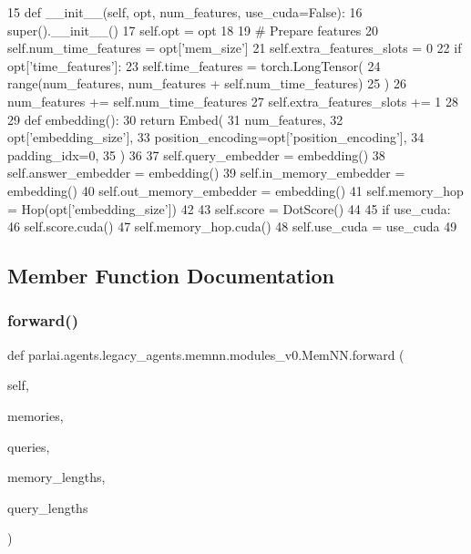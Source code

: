 \begin{DoxyCode}
15     \textcolor{keyword}{def }\_\_init\_\_(self, opt, num\_features, use\_cuda=False):
16         super().\_\_init\_\_()
17         self.opt = opt
18 
19         \textcolor{comment}{# Prepare features}
20         self.num\_time\_features = opt[\textcolor{stringliteral}{'mem\_size'}]
21         self.extra\_features\_slots = 0
22         \textcolor{keywordflow}{if} opt[\textcolor{stringliteral}{'time\_features'}]:
23             self.time\_features = torch.LongTensor(
24                 range(num\_features, num\_features + self.num\_time\_features)
25             )
26             num\_features += self.num\_time\_features
27             self.extra\_features\_slots += 1
28 
29         \textcolor{keyword}{def }embedding():
30             \textcolor{keywordflow}{return} Embed(
31                 num\_features,
32                 opt[\textcolor{stringliteral}{'embedding\_size'}],
33                 position\_encoding=opt[\textcolor{stringliteral}{'position\_encoding'}],
34                 padding\_idx=0,
35             )
36 
37         self.query\_embedder = embedding()
38         self.answer\_embedder = embedding()
39         self.in\_memory\_embedder = embedding()
40         self.out\_memory\_embedder = embedding()
41         self.memory\_hop = Hop(opt[\textcolor{stringliteral}{'embedding\_size'}])
42 
43         self.score = DotScore()
44 
45         \textcolor{keywordflow}{if} use\_cuda:
46             self.score.cuda()
47             self.memory\_hop.cuda()
48         self.use\_cuda = use\_cuda
49 
\end{DoxyCode}


\subsection{Member Function Documentation}
\mbox{\label{classparlai_1_1agents_1_1legacy__agents_1_1memnn_1_1modules__v0_1_1MemNN_ada4f6a93ff12e96bd84ccdefc40535bd}} 
\subsubsection{\texorpdfstring{forward()}{forward()}}
{\footnotesize\ttfamily def parlai.\+agents.\+legacy\+\_\+agents.\+memnn.\+modules\+\_\+v0.\+Mem\+N\+N.\+forward (\begin{DoxyParamCaption}\item[{}]{self,  }\item[{}]{memories,  }\item[{}]{queries,  }\item[{}]{memory\+\_\+lengths,  }\item[{}]{query\+\_\+lengths }\end{DoxyParamCaption})}



